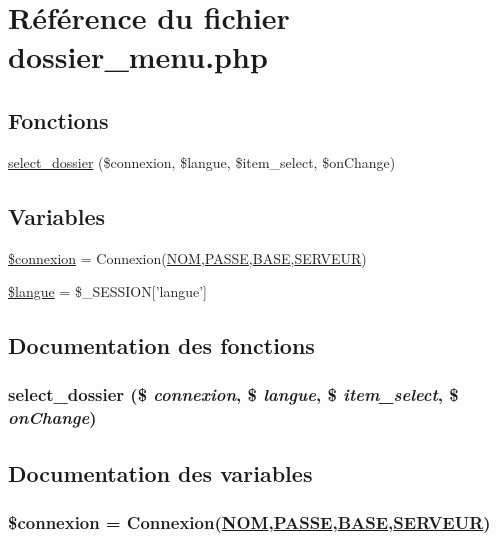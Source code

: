 \hypertarget{dossier__menu_8php}{
\section{R\'{e}f\'{e}rence du fichier dossier\_\-menu.php}
\label{dossier__menu_8php}
}
\subsection*{Fonctions}
\begin{CompactItemize}
\item 
\hyperlink{dossier__menu_8php_a2}{select\_\-dossier} (\$connexion, \$langue, \$item\_\-select, \$on\-Change)
\end{CompactItemize}
\subsection*{Variables}
\begin{CompactItemize}
\item 
\hyperlink{dossier__menu_8php_a0}{\$connexion} = Connexion(\hyperlink{pma__connect_8php_a0}{NOM},\hyperlink{pma__connect_8php_a1}{PASSE},\hyperlink{pma__connect_8php_a3}{BASE},\hyperlink{pma__connect_8php_a2}{SERVEUR})
\item 
\hyperlink{dossier__menu_8php_a1}{\$langue} = \$\_\-SESSION\mbox{[}'langue'\mbox{]}
\end{CompactItemize}


\subsection{Documentation des fonctions}
\hypertarget{dossier__menu_8php_a2}{
\subsubsection[select\_\-dossier]{\setlength{\rightskip}{0pt plus 5cm}select\_\-dossier (\$ {\em connexion}, \$ {\em langue}, \$ {\em item\_\-select}, \$ {\em on\-Change})}}
\label{dossier__menu_8php_a2}




\subsection{Documentation des variables}
\hypertarget{dossier__menu_8php_a0}{
\subsubsection[\$connexion]{\setlength{\rightskip}{0pt plus 5cm}\$connexion = Connexion(\hyperlink{pma__connect_8php_a0}{NOM},\hyperlink{pma__connect_8php_a1}{PASSE},\hyperlink{pma__connect_8php_a3}{BASE},\hyperlink{pma__connect_8php_a2}{SERVEUR})}}
\label{dossier__menu_8php_a0}


